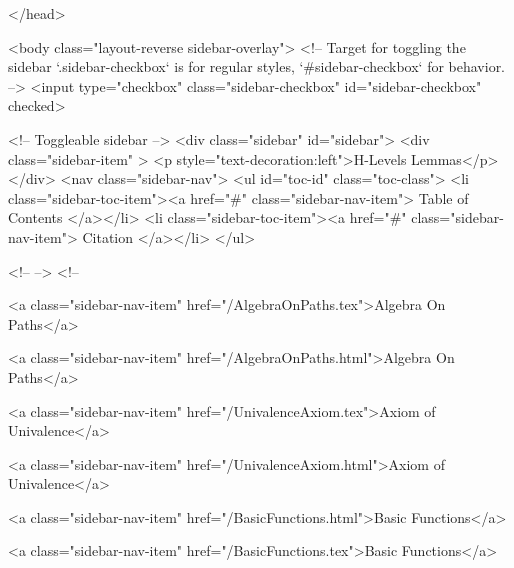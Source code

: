   
</head>




  <body class="layout-reverse sidebar-overlay">
    <!-- Target for toggling the sidebar `.sidebar-checkbox` is for regular
     styles, `#sidebar-checkbox` for behavior. -->
<input type="checkbox" class="sidebar-checkbox" id="sidebar-checkbox" checked>

<!-- Toggleable sidebar -->
<div class="sidebar" id="sidebar">
  <div class="sidebar-item" >
    <p style="text-decoration:left">H-Levels Lemmas</p>
  </div>
  <nav class="sidebar-nav">
    <ul id="toc-id" class="toc-class">
  <li class="sidebar-toc-item"><a href="#" class="sidebar-nav-item"> Table of Contents </a></li>
  <li class="sidebar-toc-item"><a href="#" class="sidebar-nav-item"> Citation </a></li>
</ul>


    <!--  -->
    <!-- 
      
    
      
    
      
    
      
        
      
    
      
        
          <a class="sidebar-nav-item" href="/AlgebraOnPaths.tex">Algebra On Paths</a>
        
      
    
      
        
          <a class="sidebar-nav-item" href="/AlgebraOnPaths.html">Algebra On Paths</a>
        
      
    
      
        
          <a class="sidebar-nav-item" href="/UnivalenceAxiom.tex">Axiom of Univalence</a>
        
      
    
      
        
          <a class="sidebar-nav-item" href="/UnivalenceAxiom.html">Axiom of Univalence</a>
        
      
    
      
        
          <a class="sidebar-nav-item" href="/BasicFunctions.html">Basic Functions</a>
        
      
    
      
        
          <a class="sidebar-nav-item" href="/BasicFunctions.tex">Basic Functions</a>
        
      
    
